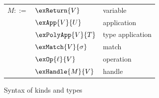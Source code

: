 \begin{figure}
{\begin{minipage}[t]{0.50\textwidth}
\begin{tabularx}{\textwidth}{rL{3.9cm}L{3cm}}
         $M ::=$
         &
         $\exReturn{V}$
         &
         variable
         \\
         &
         $\exApp{V}{U}$
         &
         application
         \\
         &
         $\exPolyApp{V}{T}$
         &
         type application
         \\
         &
         $\exMatch{V}{\sigma}$
         &
         match
         \\
         &
         $\exOp{\ell}{V}$
         &
         operation
         \\
         &
         $\exHandle{M}{V}$
         &
         handle
      \end{tabularx}
   \end{minipage}
   }
   \caption{Syntax of kinds and types}
\end{figure}
